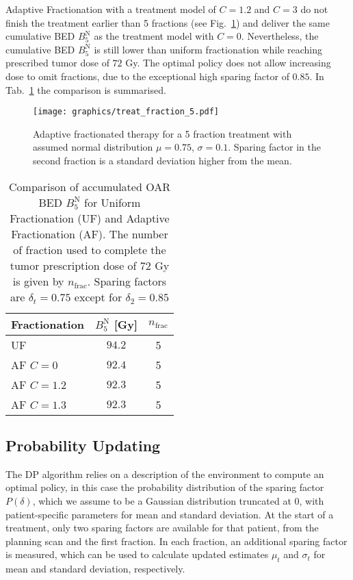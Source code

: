 \documentclass[\relativeRoot/ada.tex]{subfiles}
\begin{document}
Adaptive Fractionation with a treatment model of $C=1.2$ and $C=3$ do not finish the treatment earlier than 5 fractions (see Fig.~\ref{fig:treat_fraction_5}) and deliver the same cumulative BED $B_5^{\text{N}}$ as the treatment model with $C=0$. Nevertheless, the cumulative BED $B_5^{\text{N}}$ is still lower than uniform fractionation while reaching prescribed tumor dose of $72$ Gy. The optimal policy does not allow increasing dose to omit fractions, due to the exceptional high sparing factor of $0.85$. In Tab.~\ref{tab:result_treat_fraction_5} the comparison is summarised.

\begin{figure}[!htb]
    \centering
    \texttt{[image: graphics/treat\_fraction\_5.pdf]}
    \caption{Adaptive fractionated therapy for a 5 fraction treatment with assumed normal distribution $\mu=0.75$, $\sigma=0.1$. Sparing factor in the second fraction is a standard deviation higher from the mean.}
    \label{fig:treat_fraction_5}
\end{figure}

\begin{table}[!htb]
    \centering
    \caption{Comparison of accumulated OAR BED $B_5^{\text{N}}$ for Uniform Fractionation (UF) and Adaptive Fractionation (AF). The number of fraction used to complete the tumor prescription dose of $72$ Gy is given by $n_{\text{frac}}$. Sparing factors are $\delta_t=0.75$ except for $\delta_2=0.85$}
    \begin{tabular}{l|cc}
    \toprule
        Fractionation & $B_5^{\text{N}}$ [Gy] & $n_{\text{frac}}$ \\
    \midrule
       UF &  $94.2$ & 5 \\
       AF $C=0$ & $92.4$ & 5 \\
       AF $C=1.2$ & $92.3$ & 5 \\
       AF $C=1.3$ & $92.3$ & 5 \\
     
    \bottomrule
    \end{tabular}
    \label{tab:result_treat_fraction_5}
\end{table}

\subsection{Probability Updating}
\label{sec:probupdate}
The DP algorithm relies on a description of the environment to compute an optimal policy, in this case the probability distribution of the sparing factor $P(\delta)$, which we assume to be a Gaussian distribution truncated at $0$, with patient-specific parameters for mean and standard deviation. At the start of a treatment, only two sparing factors are available for that patient, from the planning scan and the first fraction. In each fraction, an additional sparing factor is measured, which can be used to calculate updated estimates $\mu_t$ and $\sigma_t$ for mean and standard deviation, respectively.
\end{document}
